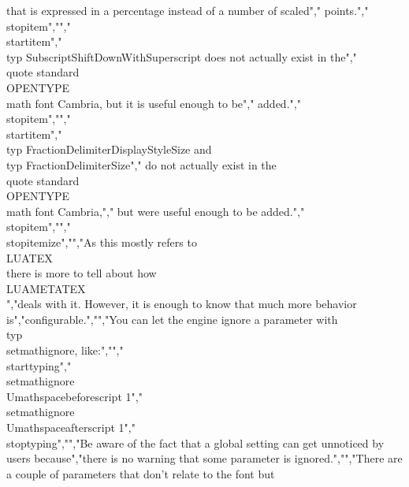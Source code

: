 that is expressed in a percentage instead of a number of scaled","    points.","\\stopitem","","\\startitem","    \\typ {SubscriptShiftDownWithSuperscript} does not actually exist in the","    \\quote {standard} \\OPENTYPE\\ math font Cambria, but it is useful enough to be","    added.","\\stopitem","","\\startitem","    \\typ {FractionDelimiterDisplayStyleSize} and \\typ {FractionDelimiterSize}","    do not actually exist in the \\quote {standard} \\OPENTYPE\\ math font Cambria,","    but were useful enough to be added.","\\stopitem","","\\stopitemize","","As this mostly refers to \\LUATEX\\ there is more to tell about how \\LUAMETATEX\\","deals with it. However, it is enough to know that much more behavior is","configurable.","","You can let the engine ignore a parameter with \\typ {\\setmathignore}, like:","","\\starttyping","\\setmathignore \\Umathspacebeforescript 1","\\setmathignore \\Umathspaceafterscript  1","\\stoptyping","","Be aware of the fact that a global setting can get unnoticed by users because","there is no warning that some parameter is ignored.","","There are a couple of parameters that don't relate to the font but 